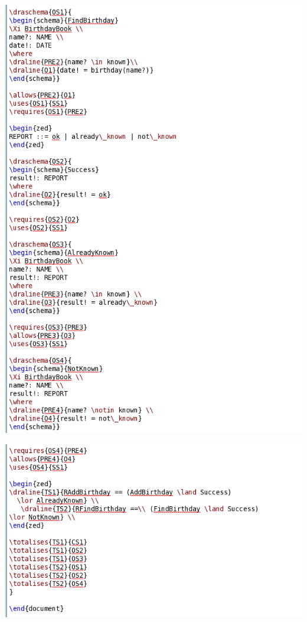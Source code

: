 \noindent \includegraphics[scale=0.5]{examples/bb/2imageb.png}

\noindent \includegraphics[scale=0.5]{examples/bb/2imagec.png}
%

